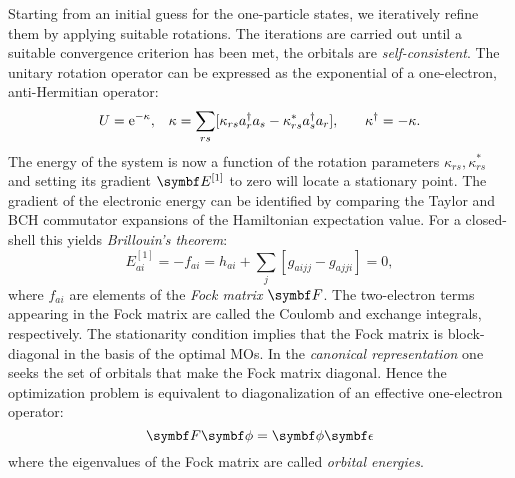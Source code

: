 Starting from an initial guess for the one-particle states, we
iteratively refine them by applying suitable rotations.
The iterations are carried out until a suitable convergence criterion
has been met, \ie the orbitals are \emph{self-consistent}.
The unitary rotation operator can be expressed as the exponential of a
one-electron, anti-Hermitian operator:
\begin{alignat}{3}
  U = \mathrm{e}^{-\kappa},
  \quad&
  \kappa = \sum_{rs}
  [\kappa_{rs} a_{r}^{\dagger}a_{s} - \kappa^*_{rs}a_{s}^{\dagger}a_{r}],
  \quad&
  \kappa^\dagger = -\kappa.
\end{alignat}
The energy of the system is now a function of the rotation parameters
$\kappa_{rs}, \kappa^*_{rs}$ and setting its gradient $\mat{E}^{[1]}$ to
zero will locate a stationary point. The gradient of the electronic
energy can be identified by comparing the Taylor and \gls{BCH}
commutator expansions of the Hamiltonian expectation value.
For a closed-shell this yields \emph{Brillouin's theorem}:
\begin{equation}\label{eq:brillouin}
  E^{[1]}_{ai} = -f_{ai}
 = h_{ai} + \sum_{j}[g_{aijj} - g_{ajji}] = 0,
\end{equation}
where $f_{ai}$ are elements of the \emph{Fock matrix} $\mat{F}$.
The two-electron terms appearing in the Fock matrix are called the
Coulomb and exchange integrals, respectively.
The stationarity condition implies that the Fock matrix is
block-diagonal in the basis of the optimal \glspl{MO}.
In the \emph{canonical representation} one seeks the set of orbitals
that make the Fock matrix diagonal. Hence the optimization problem is
equivalent to diagonalization of an effective one-electron operator:
\begin{equation}\label{eq:fock-eq}
 \mat{F}\vect{\phi} = \vect{\phi}\mat{\epsilon}
\end{equation}
where the eigenvalues of the Fock matrix are called \emph{orbital
energies}.

